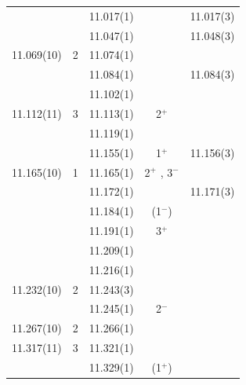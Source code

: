 \begin{center}
\begin{longtable}{cc cc c}
                       &          & 11.017(1)   &                               &    11.017(3)  \\
                       &          & 11.047(1)   &                               &    11.048(3)  \\
    11.069(10)         & 2        & 11.074(1)   &                               &               \\
                       &          & 11.084(1)   &                               &    11.084(3)  \\
                       &          & 11.102(1)   &                               &               \\
     11.112(11)        & 3        & 11.113(1)   &            2$^+$              &               \\
                       &          & 11.119(1)   &                               &               \\
                       &          & 11.155(1)   &            1$^+$              &    11.156(3)  \\
    11.165(10)         & 1        & 11.165(1)   &            2$^+$ ,  3$^-$     &               \\
                       &          & 11.172(1)   &                               &    11.171(3)  \\
                       &          & 11.184(1)   &            (1$^-$)            &               \\
                       &          & 11.191(1)   &            3$^+$              &               \\
                       &          & 11.209(1)   &                               &               \\
                       &          & 11.216(1)   &                               &               \\
    11.232(10)         & 2        & 11.243(3)   &                               &               \\
                       &          & 11.245(1)   &            2$^-$              &               \\
    11.267(10)         & 2        & 11.266(1)   &                               &               \\
    11.317(11)         & 3        & 11.321(1)   &                               &               \\
                       &          & 11.329(1)   &           (1$^+$)             &               \\

\end{longtable}
\end{center}
